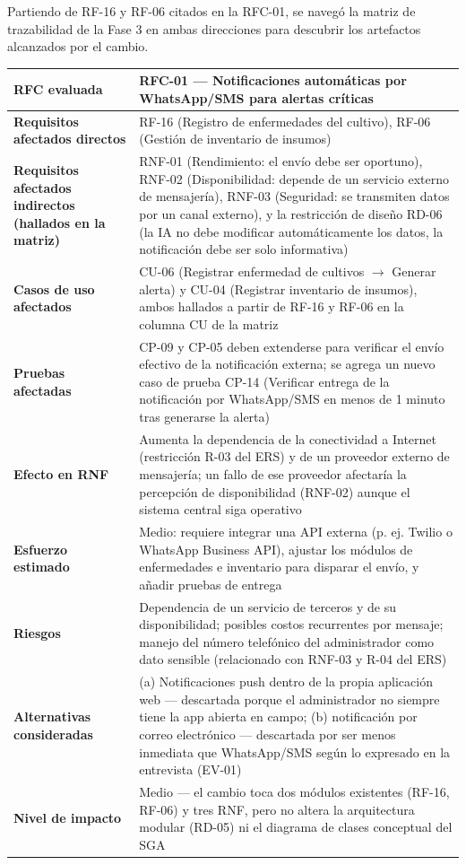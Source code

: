 \documentclass[12pt,a4paper]{article}
\begin{document}
Partiendo de RF-16 y RF-06 citados en la RFC-01, se navegó la matriz de trazabilidad de la Fase 3 en ambas direcciones para descubrir los artefactos alcanzados por el cambio.

\begin{table}[H]
\centering
\begin{tabular}{@{}p{4cm}p{10cm}@{}}
\toprule
\textbf{RFC evaluada} & RFC-01 --- Notificaciones automáticas por WhatsApp/SMS para alertas críticas \\
\midrule
\textbf{Requisitos afectados directos} & RF-16 (Registro de enfermedades del cultivo), RF-06 (Gestión de inventario de insumos) \\
\textbf{Requisitos afectados indirectos (hallados en la matriz)} & RNF-01 (Rendimiento: el envío debe ser oportuno), RNF-02 (Disponibilidad: depende de un servicio externo de mensajería), RNF-03 (Seguridad: se transmiten datos por un canal externo), y la restricción de diseño RD-06 (la IA no debe modificar automáticamente los datos, la notificación debe ser solo informativa) \\
\textbf{Casos de uso afectados} & CU-06 (Registrar enfermedad de cultivos $\rightarrow$ Generar alerta) y CU-04 (Registrar inventario de insumos), ambos hallados a partir de RF-16 y RF-06 en la columna CU de la matriz \\
\textbf{Pruebas afectadas} & CP-09 y CP-05 deben extenderse para verificar el envío efectivo de la notificación externa; se agrega un nuevo caso de prueba CP-14 (Verificar entrega de la notificación por WhatsApp/SMS en menos de 1 minuto tras generarse la alerta) \\
\textbf{Efecto en RNF} & Aumenta la dependencia de la conectividad a Internet (restricción R-03 del ERS) y de un proveedor externo de mensajería; un fallo de ese proveedor afectaría la percepción de disponibilidad (RNF-02) aunque el sistema central siga operativo \\
\textbf{Esfuerzo estimado} & Medio: requiere integrar una API externa (p. ej. Twilio o WhatsApp Business API), ajustar los módulos de enfermedades e inventario para disparar el envío, y añadir pruebas de entrega \\
\textbf{Riesgos} & Dependencia de un servicio de terceros y de su disponibilidad; posibles costos recurrentes por mensaje; manejo del número telefónico del administrador como dato sensible (relacionado con RNF-03 y R-04 del ERS) \\
\textbf{Alternativas consideradas} & (a) Notificaciones push dentro de la propia aplicación web --- descartada porque el administrador no siempre tiene la app abierta en campo; (b) notificación por correo electrónico --- descartada por ser menos inmediata que WhatsApp/SMS según lo expresado en la entrevista (EV-01) \\
\textbf{Nivel de impacto} & Medio --- el cambio toca dos módulos existentes (RF-16, RF-06) y tres RNF, pero no altera la arquitectura modular (RD-05) ni el diagrama de clases conceptual del SGA \\
\bottomrule
\end{tabular}
\end{table}
\end{document}

